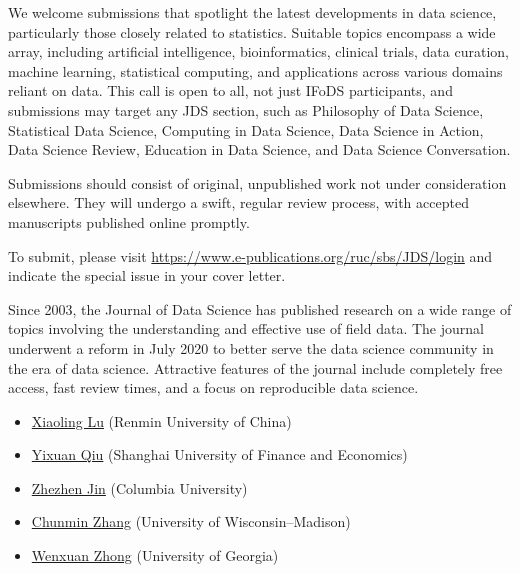 \documentclass[12pt]{article}
\begin{document}
We welcome submissions that spotlight the latest developments in data
science, particularly those closely related to statistics. Suitable
topics encompass a wide array, including artificial intelligence,
bioinformatics, clinical trials, data curation, machine learning,
statistical computing, and applications across various domains reliant
on data. This call is open to all, not just IFoDS participants, and
submissions may target any JDS section, such as Philosophy of Data
Science, Statistical Data Science, Computing in Data Science, Data
Science in Action, Data Science Review, Education in Data Science, and
Data Science Conversation.


Submissions should consist of original, unpublished work not under
consideration elsewhere. They will undergo a swift, regular review
process, with accepted manuscripts published online promptly.



To submit, please visit
\url{https://www.e-publications.org/ruc/sbs/JDS/login} and indicate
the special issue in your cover letter.


Since 2003, the Journal of Data Science has published research on a
wide range of topics involving the understanding and effective use of
field data. The journal underwent a reform in July 2020 to better serve
the data science community in the era of data science. Attractive
features of the journal include completely free access, fast review
times, and a focus on reproducible data science.


\bigskip
{}
\begin{itemize}[leftmargin=2ex, topsep=2pt,itemsep=2pt,partopsep=0pt, parsep=0pt]
\item
\href{http://stat.ruc.edu.cn/jxtd/jsdw/sjkxydsjtjx/5b900093966a43e0ab69dfbaf82e095a.htm}{Xiaoling Lu} (Renmin University of China)

\item
\href{https://statr.me/about/}
{Yixuan Qiu} (Shanghai University of Finance and Economics)

\item
\href{https://www.columbia.edu/~zj7/}
{Zhezhen Jin} (Columbia University)

\item
\href{https://pages.stat.wisc.edu/~cmzhang/}
{Chunmin Zhang} (University of Wisconsin–Madison)

\item
\href{http://faculty.franklin.uga.edu/wenxuan/}
{Wenxuan Zhong} (University of Georgia)
\end{itemize}
\end{document}
